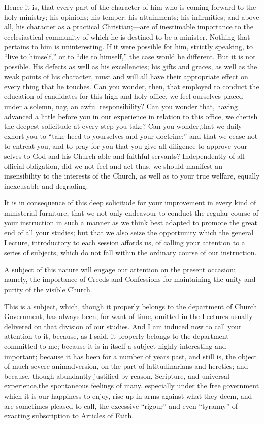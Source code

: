 \documentclass[
]{book}
\begin{document}
Hence it is, that every part of the character of him who is coming forward to the holy ministry; his opinions; his temper; his attainments; his infirmities; and above all, his character as a practical Christian;---are of inestimable importance to the ecclesiastical community of which he is destined to be a minister. Nothing that pertains to him is uninteresting. If it were possible for him, strictly speaking, to ``live to himself,'' or to ``die to himself,'' the case would be different. But it is not possible. His defects as well as his excellencies; his gifts and graces, as well as the weak points of his character, must and will all have their appropriate effect on every thing that he touches. Can you wonder, then, that employed to conduct the education of candidates for this high and holy office, we feel ourselves placed under a solemn, nay, an awful responsibility? Can you wonder that, having advanced a little before you in our experience in relation to this office, we cherish the deepest solicitude at every step you take? Can you wonder,that we daily exhort you to ``take heed to yourselves and your doctrine;'' and that we cease not to entreat you, and to pray for you that you give all diligence to approve your selves to God and his Church able and faithful servants? Independently of all official obligation, did we not feel and act thus, we should manifest an insensibility to the interests of the Church, as well as to your true welfare, equally inexcusable and degrading.

It is in consequence of this deep solicitude for your improvement in every kind of ministerial furniture, that we not only endeavour to conduct the regular course of your instruction in such a manner as we think best adapted to promote the great end of all your studies; but that we also seize the opportunity which the general Lecture, introductory to each session affords us, of calling your attention to a series of subjects, which do not fall within the ordinary course of our instruction.

A subject of this nature will engage our attention on the present occasion: namely, the importance of Creeds and Confessions for maintaining the unity and purity of the visible Church.

This is a subject, which, though it properly belongs to the department of Church Government, has always been, for want of time, omitted in the Lectures usually delivered on that division of our studies. And I am induced now to call your attention to it, because, as I said, it properly belongs to the department committed to me; because it is in itself a subject highly interesting and important; because it has been for a number of years past, and still is, the object of much severe animadversion, on the part of latitudinarians and heretics; and because, though abundantly justified by reason, Scripture, and universal experience,the spontaneous feelings of many, especially under the free government which it is our happiness to enjoy, rise up in arms against what they deem, and are sometimes pleased to call, the excessive ``rigour'' and even ``tyranny'' of exacting subscription to Articles of Faith.
\end{document}
